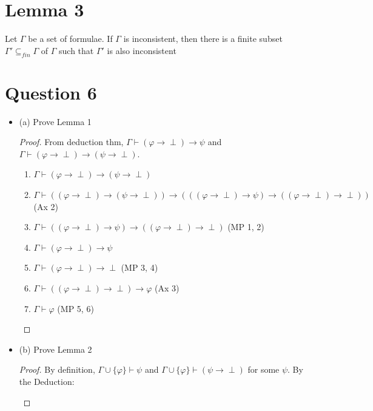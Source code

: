 \documentclass{article}
\begin{document}
\section*{Lemma 3}
Let $\Gamma$ be a set of formulae. If $\Gamma$ is inconsistent, then there is a finite subset $\Gamma' \subseteq_{fin} \Gamma$ of $\Gamma$ such that $\Gamma'$ is also inconsistent

\section*{Question 6}
\begin{itemize}
    \item (a) Prove Lemma 1
        \begin{proof}
            From deduction thm, $\Gamma \vdash (\varphi \rightarrow \perp) \rightarrow \psi$ and $\Gamma \vdash (\varphi \rightarrow \perp) \rightarrow (\psi \rightarrow \perp)$.
            \begin{enumerate}
                \item $\Gamma \vdash (\varphi \rightarrow \perp) \rightarrow (\psi \rightarrow \perp)$ 
                \item $\Gamma \vdash ((\varphi \rightarrow \perp) \rightarrow (\psi \rightarrow \perp)) \rightarrow (((\varphi \rightarrow \perp) \rightarrow \psi) \rightarrow ((\varphi \rightarrow \perp) \rightarrow \perp))$ (Ax 2)
                \item $\Gamma \vdash ((\varphi \rightarrow \perp) \rightarrow \psi) \rightarrow ((\varphi \rightarrow \perp) \rightarrow \perp)$ (MP 1, 2)
                \item $\Gamma \vdash (\varphi \rightarrow \perp) \rightarrow \psi$
                \item $\Gamma \vdash (\varphi \rightarrow \perp) \rightarrow \perp$ (MP 3, 4)
                \item $\Gamma \vdash ((\varphi \rightarrow \perp) \rightarrow \perp) \rightarrow \varphi$ (Ax 3)
                \item $\Gamma \vdash \varphi$ (MP 5, 6)
            \end{enumerate}
        \end{proof}
    \item (b) Prove Lemma 2
    \begin{proof}
        By definition, $\Gamma \cup \{\varphi\} \vdash \psi$ and $\Gamma \cup \{\varphi\} \vdash (\psi \rightarrow \perp)$ for some $\psi$. 
        By the Deduction:
        \begin{enumerate}

\end{enumerate}
\end{proof}
\end{itemize}
\end{document}
